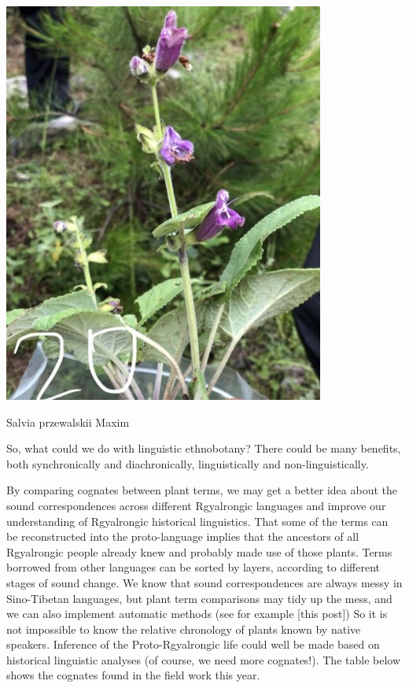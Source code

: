 \documentclass[
  a4paper,
  14pt,
  oneside,
  tablecaptionabove
]{scrbook}
\begin{document}
\leavevmode\hypertarget{attachment_2167}{}%
\includegraphics[width=4.15625in,height=5.20833in]{images/2711575733084_.pic_hd-399x500.jpg}

Salvia przewalskii Maxim

So, what could we do with linguistic ethnobotany? There could be many
benefits, both synchronically and diachronically, linguistically and
non-linguistically.

By comparing cognates between plant terms, we may get a better idea
about the sound correspondences across different Rgyalrongic languages
and improve our understanding of Rgyalrongic historical linguistics.
That some of the terms can be reconstructed into the proto-language
implies that the ancestors of all Rgyalrongic people already knew and
probably made use of those plants. Terms borrowed from other languages
can be sorted by layers, according to different stages of sound change.
We know that sound correspondences are always messy in Sino-Tibetan
languages, but plant term comparisons may tidy up the mess, and we can
also implement automatic methods (see for example {[}this post{]}) So it
is not impossible to know the relative chronology of plants known by
native speakers. Inference of the Proto-Rgyalrongic life could well be
made based on historical linguistic analyses (of course, we need more
cognates!). The table below shows the cognates found in the field work
this year.
\end{document}
